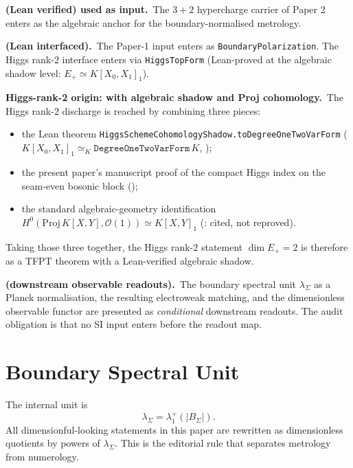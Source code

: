 \documentclass[11pt,a4paper]{article}
\begin{document}
\begin{tfptstatusbox}
\textbf{ (Lean verified) used as input.}\ The $3+2$
hypercharge carrier of Paper 2 enters as the algebraic anchor
for the boundary-normalised metrology.

\smallskip
\textbf{ (Lean interfaced).}\ The Paper-1 input enters
as \texttt{BoundaryPolarization}. The Higgs rank-2 interface
enters via \texttt{HiggsTopForm} (Lean-proved at the algebraic
shadow level: $E_+ \simeq K[X_0,X_1]_1$).

\smallskip
\textbf{Higgs-rank-2 origin:  with  algebraic
shadow and  Proj cohomology.}\ The Higgs rank-2
discharge is reached by combining three pieces:
\begin{itemize}[leftmargin=1.6em, itemsep=0pt]
    \item the Lean theorem
        \texttt{HiggsSchemeCohomologyShadow.toDegreeOneTwoVarForm}
        ($K[X_0,X_1]_1 \simeq_K \texttt{DegreeOneTwoVarForm}\,K$,
        );
    \item the present paper's manuscript proof of the compact
        Higgs index on the seam-even bosonic block ();
    \item the standard algebraic-geometry identification
        $H^0(\mathrm{Proj}\,K[X,Y], \mathcal O(1)) \simeq K[X,Y]_1$
        (: cited, not reproved).
\end{itemize}
Taking those three together, the Higgs rank-2 statement
$\dim E_+ = 2$ is therefore  as a TFPT theorem with a
Lean-verified algebraic shadow.

\smallskip
\textbf{ (downstream observable readouts).}\ The
boundary spectral unit $\lambda_\Sigma$ as a Planck
normalisation, the resulting electroweak matching, and the
dimensionless observable functor are presented as
\emph{conditional} downstream readouts. The audit obligation
is that no SI input enters before the readout map.
\end{tfptstatusbox}

\tableofcontents

\section{Boundary Spectral Unit}

The internal unit is
\[
\lambda_\Sigma=\lambda_1^+(|B_\Sigma|).
\]
All dimensionful-looking statements in this paper are rewritten as dimensionless quotients by
powers of $\lambda_\Sigma$. This is the editorial rule that separates metrology from numerology.
\end{document}

